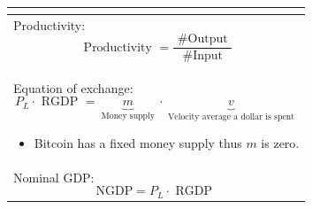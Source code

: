 \documentclass[openany]{book}
\begin{document}
\begin{center}
\begin{supertabular}{ |p{16cm}| }
\[        \] \\ 
        \hline 
        Productivity:  
        \[
            \text{ Productivity } = \frac{\text{ \#Output }}{\text{ \#Input }} 
        \] \\ 
        \hline
        Equation of exchange: 
        \[
          P_L \cdot \text{ RGDP } = \underbrace{m}_{\text{ Money supply }} \cdot \underbrace{v}_{\text{ Velocity average a dollar is spent }}
        \] \begin{itemize}
            \item Bitcoin has a fixed money supply thus $m$ is zero. 
        \end{itemize}\\ 
        \hline
        Nominal GDP: 
        \[
          \text{NGDP} = P_L \cdot \text{ RGDP }
        \] \\ 
        \hline
    \end{supertabular}
\end{center}


\end{document}
